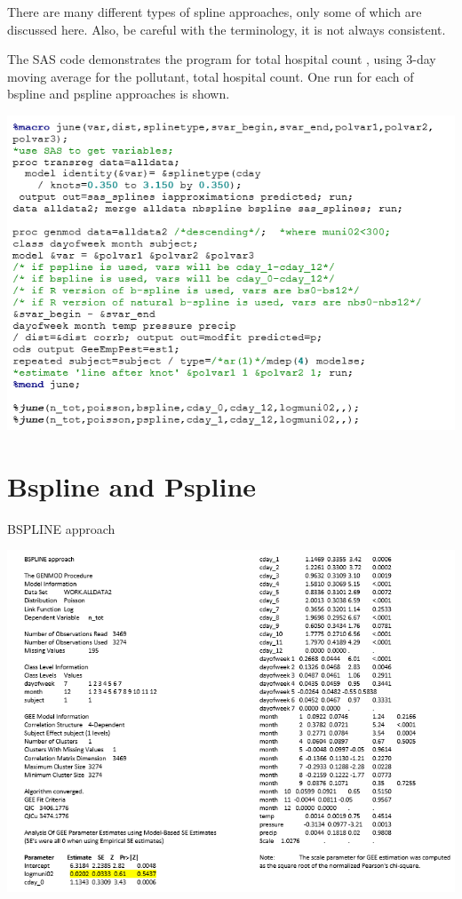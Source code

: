 \documentclass[
  9pt,
  ignorenonframetext,
]{beamer}
\begin{document}
\begin{frame}{}
\protect\hypertarget{section-16}{}
There are many different types of spline approaches, only some of which
are discussed here. Also, be careful with the terminology, it is not
always consistent.

The SAS code demonstrates the program for total hospital count , using
3-day moving average for the pollutant, total hospital count. One run
for each of bspline and pspline approaches is shown.

\begin{center}\includegraphics[width=0.5\linewidth]{figs_L12/f17} \end{center}
\end{frame}

\hypertarget{bspline-and-pspline}{%
\section{Bspline and Pspline}\label{bspline-and-pspline}}

\begin{frame}{BSPLINE approach}
\protect\hypertarget{bspline-approach}{}
\begin{center}\includegraphics[width=0.7\linewidth]{figs_L12/f18} \end{center}
\end{frame}
\end{document}
